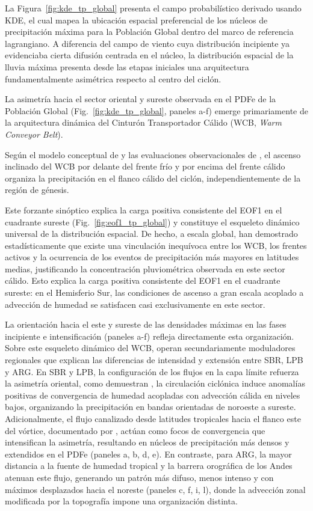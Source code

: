 La Figura~\ref{fig:kde_tp_global} presenta el campo probabilístico derivado usando KDE, el cual mapea la ubicación espacial preferencial de los núcleos de precipitación máxima para la Población Global dentro del marco de referencia lagrangiano.
A diferencia del campo de viento cuya distribución incipiente ya evidenciaba cierta difusión centrada en el núcleo, la distribución espacial de la lluvia máxima presenta desde las etapas iniciales una arquitectura fundamentalmente asimétrica respecto al centro del ciclón.

La asimetría hacia el sector oriental y sureste observada en el PDFe de la Población Global (Fig.~\ref{fig:kde_tp_global}, paneles a-f) emerge primariamente de la arquitectura dinámica del Cinturón Transportador Cálido (WCB, \textit{Warm Conveyor Belt}). 

Según el modelo conceptual de \citet{browning1986conceptual} y las evaluaciones observacionales de \citet{naud2020evaluation}, el ascenso inclinado del WCB por delante del frente frío y por encima del frente cálido organiza la precipitación en el flanco cálido del ciclón, independientemente de la región de génesis. 

Este forzante sinóptico explica la carga positiva consistente del EOF1 en el cuadrante sureste (Fig.~\ref{fig:eof1_tp_global}) y constituye el esqueleto dinámico universal de la distribución espacial. 
De hecho, a escala global, \citet{catto2015fronts} han demostrado estadísticamente que existe una vinculación inequívoca entre los WCB, los frentes activos y la ocurrencia de los eventos de precipitación más mayores en latitudes medias, justificando la concentración pluviométrica observada en este sector cálido. Esto explica la carga positiva consistente del EOF1 en el cuadrante sureste: en el Hemisferio Sur, las condiciones de ascenso a gran escala acoplado a advección de humedad se satisfacen casi exclusivamente en este sector.

La orientación hacia el este y sureste de las densidades máximas en las fases incipiente e intensificación (paneles a-f) refleja directamente esta organización.
Sobre este esqueleto dinámico del WCB, operan secundariamente moduladores regionales que explican las diferencias de intensidad y extensión entre SBR, LPB y ARG. En SBR y LPB, la configuración de los flujos en la capa límite refuerza la asimetría oriental, como demuestran \citet{cardoso2022synoptic}, la circulación ciclónica induce anomalías positivas de convergencia de humedad acopladas con advección cálida en niveles bajos, organizando la precipitación en bandas orientadas de noroeste a sureste. 
Adicionalmente, el flujo canalizado desde latitudes tropicales hacia el flanco este del vórtice, documentado por \citet{vera2002cold}, actúan como focos de convergencia que intensifican la asimetría, resultando en núcleos de precipitación más densos y extendidos en el PDFe (paneles a, b, d, e). 
En contraste, para ARG, la mayor distancia a la fuente de humedad tropical y la barrera orográfica de los Andes atenuan este flujo, generando un patrón más difuso, menos intenso y con máximos desplazados hacia el noreste (paneles c, f, i, l), donde la advección zonal modificada por la topografía impone una organización distinta.

